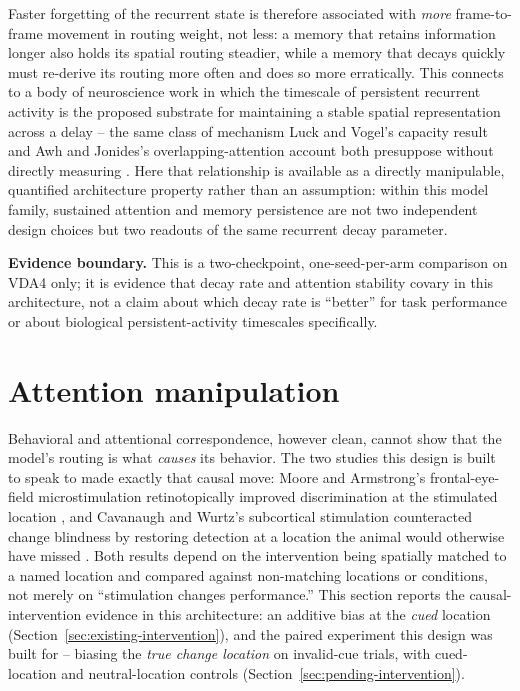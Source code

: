 \documentclass[11pt,a4paper]{article}
\newcommand{\boundary}[1]{\par\smallskip\noindent\colorbox{VdaLight}{\parbox{0.96\linewidth}{\textbf{Evidence boundary.} #1}}\par\smallskip}
\begin{document}
Faster forgetting of the recurrent state is therefore associated with \emph{more} frame-to-frame movement in routing weight, not less: a memory that retains information longer also holds its spatial routing steadier, while a memory that decays quickly must re-derive its routing more often and does so more erratically. This connects to a body of neuroscience work in which the timescale of persistent recurrent activity is the proposed substrate for maintaining a stable spatial representation across a delay -- the same class of mechanism Luck and Vogel's capacity result and Awh and Jonides's overlapping-attention account both presuppose without directly measuring \cite{luck1997,awh2001}. Here that relationship is available as a directly manipulable, quantified architecture property rather than an assumption: within this model family, sustained attention and memory persistence are not two independent design choices but two readouts of the same recurrent decay parameter. \boundary{This is a two-checkpoint, one-seed-per-arm comparison on VDA4 only; it is evidence that decay rate and attention stability covary in this architecture, not a claim about which decay rate is ``better'' for task performance or about biological persistent-activity timescales specifically.}

\section{Attention manipulation}\label{sec:intervention}
Behavioral and attentional correspondence, however clean, cannot show that the model's routing is what \emph{causes} its behavior. The two studies this design is built to speak to made exactly that causal move: Moore and Armstrong's frontal-eye-field microstimulation retinotopically improved discrimination at the stimulated location \cite{moore2003}, and Cavanaugh and Wurtz's subcortical stimulation counteracted change blindness by restoring detection at a location the animal would otherwise have missed \cite{cavanaugh2004}. Both results depend on the intervention being spatially matched to a named location and compared against non-matching locations or conditions, not merely on ``stimulation changes performance.'' This section reports the causal-intervention evidence in this architecture: an additive bias at the \emph{cued} location (Section~\ref{sec:existing-intervention}), and the paired experiment this design was built for -- biasing the \emph{true change location} on invalid-cue trials, with cued-location and neutral-location controls (Section~\ref{sec:pending-intervention}).
\end{document}
